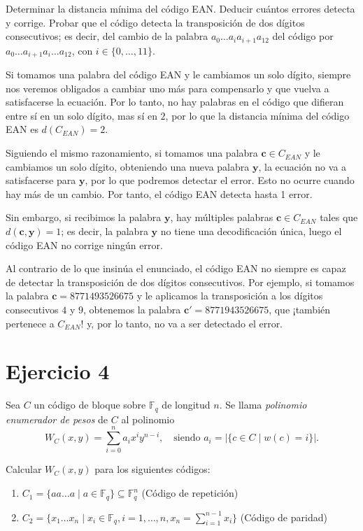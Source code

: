 \begin{formulationBox}
	Determinar la distancia mínima del código EAN. Deducir cuántos errores detecta y corrige. Probar que el código detecta la transposición de dos dígitos consecutivos; es decir, del cambio de la palabra $a_0\dots a_ia_{i+1}a_{12}$ del código por $a_0\dots a_{i+1}a_i\dots a_{12}$, con $i\in\{0,\dots,11\}$.
\end{formulationBox}

Si tomamos una palabra del código EAN y le cambiamos un solo dígito, siempre nos veremos obligados a cambiar uno más para compensarlo y que vuelva a satisfacerse la ecuación. Por lo tanto, no hay palabras en el código que difieran entre sí en un solo dígito, mas sí en $2$, por lo que la distancia mínima del código EAN es $d(C_{EAN})=2$.

Siguiendo el mismo razonamiento, si tomamos una palabra $\textbf{c}\in C_{EAN}$ y le cambiamos un solo dígito, obteniendo una nueva palabra $\textbf{y}$, la ecuación no va a satisfacerse para $\textbf{y}$, por lo que podremos detectar el error. Esto no ocurre cuando hay más de un cambio. Por tanto, el código EAN detecta hasta 1 error.

Sin embargo, si recibimos la palabra $\textbf{y}$, hay múltiples palabras $\textbf{c}\in C_{EAN}$ tales que $d(\textbf{c}, \textbf{y}) = 1$; es decir, la palabra $\textbf{y}$ no tiene una decodificación única, luego el código EAN no corrige ningún error.

Al contrario de lo que insinúa el enunciado, el código EAN no siempre es capaz de detectar la transposición de dos dígitos consecutivos. Por ejemplo, si tomamos la palabra $\textbf{c} = 8771493526675$ y le aplicamos la transposición a los dígitos consecutivos $4$ y $9$, obtenemos la palabra $\textbf{c}' = 8771943526675$, que ¡también pertenece a $C_{EAN}$! y, por lo tanto, no va a ser detectado el error.

\section{Ejercicio 4}

\begin{formulationBox}
	Sea $C$ un código de bloque sobre $\mathbb{F}_q$ de longitud $n$. Se llama \textit{polinomio enumerador de pesos} de $C$ al polinomio
	\[W_C(x,y) = \sum_{i=0}^n a_i x^i y^{n-i}, \quad \text{siendo } a_i = |\{c \in C \mid w(c) = i\}|.\]
	
	Calcular $W_C(x,y)$ para los siguientes códigos:
	
	\begin{enumerate}[label=\alph*)]
		\item $C_1 = \{aa\dots a \mid a\in\mathbb{F}_q\} \subseteq \mathbb{F}_q^n$ (Código de repetición)
		\item $C_2 = \{x_1\dots x_n \mid x_i\in\mathbb{F}_q, i = 1, \dots, n, x_n = \sum_{i=1}^{n-1} x_i \}$ (Código de paridad)
	\end{enumerate}
\end{formulationBox}

